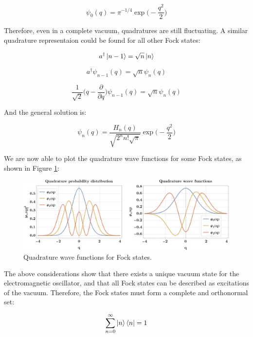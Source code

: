 \documentclass[12pt,a4paper]{report}
\begin{document}
\begin{equation}
    \psi_0(q)=\pi^{-1/4}\exp\Big(-\frac{q^2}{2}\Big)
\end{equation}

Therefore, even in a complete vacuum, quadratures are still fluctuating. A similar quadrature representaion could be found for all other Fock states:

\begin{equation}
    a^{\dag}\ket{n-1}=\sqrt{n}\ket{n}
\end{equation}

\begin{equation}
    a^{\dag}\psi_{n-1}(q)=\sqrt{n}\psi_n(q)
\end{equation}

\begin{equation}
    \frac{1}{\sqrt{2}}\Big(q-\frac{\partial}{\partial q}\Big)\psi_{n-1}(q)=\sqrt{n}\psi_n(q)
\end{equation}

And the general solution is:

\begin{equation}
    \psi_n(q)=\frac{H_n(q)}{\sqrt{2^nn!\sqrt{\pi}}}\exp\Big( -\frac{q^2}{2} \Big)
\end{equation}

We are now able to plot the quadrature wave functions for some Fock states, as shown in Figure \ref{quadrature.wave.functions}:

\begin{figure}[H]
    \centering
    \includegraphics[width=1.0\linewidth]{quadrature wave functinos.png}
    \caption{Quadrature wave functions for Fock states.}
    \label{quadrature.wave.functions}
\end{figure}

The above considerations show that there exists a unique vacuum state for the electromagnetic oscillator, and that all Fock states can be described as excitations of the vacuum. Therefore, the Fock states must form a complete and orthonormal set:

\begin{equation}
    \sum_{n=0}^{\infty}\ket{n}\bra{n}=1
\end{equation}
\end{document}
